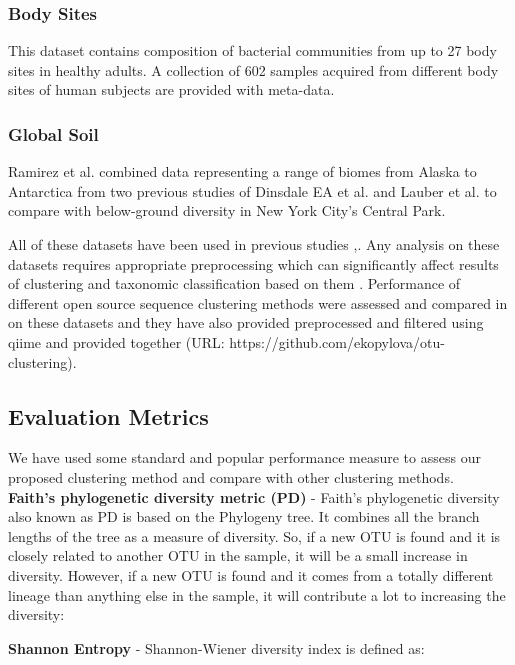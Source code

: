 \documentclass[10pt, conference, compsocconf]{IEEEtran}
\begin{document}
\subsubsection{Body Sites}
This dataset contains composition of bacterial communities from up to 27 body sites in healthy adults. A collection of 602 samples acquired from different body sites of human subjects are provided with meta-data.

\subsubsection{Global Soil}
Ramirez et al.\cite{MARglobalSoil} combined data representing a range of biomes from Alaska to Antarctica from two previous studies of Dinsdale EA et al.\cite{MARnineBiomes} and Lauber et al.\cite{MARrestOfGlobalSoil} to compare with below-ground diversity in New York City's Central Park.

All of these datasets have been used in previous studies \cite{MARmockDatasetRef},\cite{MARopenDeNovo}. Any analysis on these datasets requires appropriate preprocessing which can significantly affect results of clustering and taxonomic classification based on them \cite{MARmockDatasetRef}. Performance of different open source sequence clustering methods were assessed and compared in \cite{MARopenDeNovo} on these datasets and they have also provided preprocessed and filtered using qiime and provided together (URL: https://github.com/ekopylova/otu-clustering).         
    

\subsection{Evaluation Metrics}
We have used some standard and popular performance measure to assess our proposed clustering method and compare with other clustering methods.\\ 
\hspace*{4mm}\textbf{Faith’s phylogenetic diversity metric (PD)} - Faith’s phylogenetic diversity \cite{MARfaith1992conservation} also known as PD  is based on the Phylogeny tree. It combines all the branch lengths of the tree as a measure of diversity. So, if a new OTU is found and it is closely related to another OTU in the sample, it will be a small increase in diversity. However, if a new OTU is found and it comes from a totally different lineage than anything else in the sample, it will contribute a lot to increasing the diversity:

\hspace*{4mm}\textbf{Shannon Entropy} - Shannon-Wiener diversity index is defined as:
\end{document}
